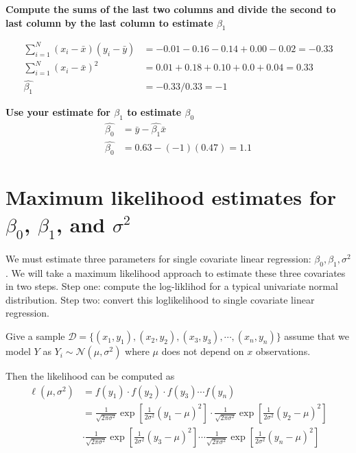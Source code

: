 \textbf{Compute the sums of the last two columns and divide the second to last column by the last column to estimate $\beta_{1}$ }

\begin{align}
    \sum_{i=1}^{N} (x_{i} - \bar{x})(y_{i} - \bar{y}) &= -0.01 -0.16 - 0.14 + 0.00 - 0.02  = - 0.33 \\ 
    \sum_{i=1}^{N} (x_{i} - \bar{x})^{2} &= 0.01 + 0.18 + 0.10 + 0.0 + 0.04 = 0.33 \\ 
    \hat{\beta_{1}} &= -0.33 / 0.33 = -1
\end{align}

\textbf{Use your estimate for $\beta_{1}$ to estimate $\beta_{0}$}
\begin{align}
    \hat{\beta_{0}} &= \bar{y} - \hat{\beta_{1}} \bar{x} \\ 
    \hat{\beta_{0}} &= 0.63 - (-1)(0.47)  = 1.1
\end{align}



\section{Maximum likelihood estimates for $\beta_{0}$, $\beta_{1}$, and $\sigma^{2}$}

We must estimate three parameters for single covariate linear regression: $\beta_{0}, \beta_{1}, \sigma^{2}$.
We will take a maximum likelihood approach to estimate these three covariates in two steps.
Step one: compute the log-liklihod for a typical univariate normal distribution. Step two: convert this loglikelihood to single covariate linear regression.

Give a sample $\mathcal{D} = \{ (x_{1},y_{1}), (x_{2},y_{2}), (x_{3},y_{3}), \cdots, (x_{n},y_{n})\}$ assume that we model $Y$ as $Y_{i} \sim \mathcal{N}\left(\mu, \sigma^{2} \right)$ where $\mu$ does not depend on $x$ observations. 

Then the likelihood can be computed as 
\begin{align*}
    \ell ( \mu, \sigma^{2}) &= f(y_{1}) \cdot f(y_{2}) \cdot f(y_{3}) \cdots f(y_{n}) \\ 
    &= \frac{1}{\sqrt{2 \pi \sigma^{2} } } \exp \left[  \frac{1}{2 \sigma^{2}} \left (y_{1} - \mu \right)^{2} \right] \cdot \frac{1}{\sqrt{2 \pi \sigma^{2} } } \exp \left[  \frac{1}{2 \sigma^{2}} \left (y_{2} - \mu \right)^{2} \right] \\
    & \cdot \frac{1}{\sqrt{2 \pi \sigma^{2} } } \exp \left[  \frac{1}{2 \sigma^{2}} \left (y_{3} - \mu \right)^{2} \right] \cdots \frac{1}{\sqrt{2 \pi \sigma^{2} } } \exp \left[  \frac{1}{2 \sigma^{2}} \left (y_{n} - \mu \right)^{2} \right]
\end{align*}

